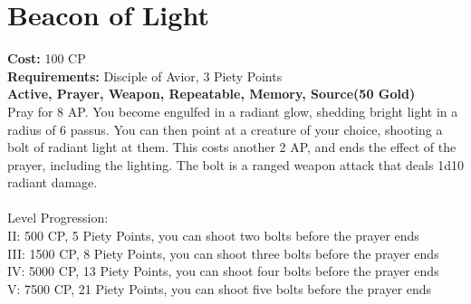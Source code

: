 \section{Beacon of Light}
\textbf{Cost:} 100 CP\\
\textbf{Requirements:} Disciple of Avior, 3 Piety Points \\
\textbf{Active, Prayer, Weapon, Repeatable, Memory, Source(50 Gold)}\\
Pray for 8 AP. You become engulfed in a radiant glow, shedding bright light in a radius of 6 passus. You can then point at a creature of your choice, shooting a bolt of radiant light at them. This costs another 2 AP, and ends the effect of the prayer, including the lighting. The bolt is a ranged weapon attack that deals 1d10 radiant damage.\\
\\
Level Progression:\\
II: 500 CP, 5 Piety Points, you can shoot two bolts before the prayer ends\\
III: 1500 CP, 8 Piety Points, you can shoot three bolts before the prayer ends\\
IV: 5000 CP, 13 Piety Points, you can shoot four bolts before the prayer ends\\
V: 7500 CP, 21 Piety Points, you can shoot five bolts before the prayer ends\\